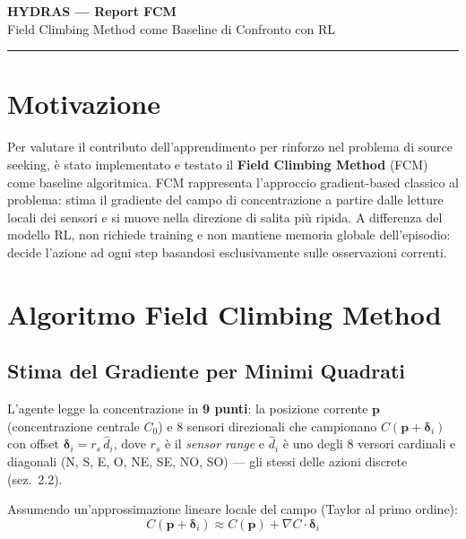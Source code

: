\documentclass[12pt, a4paper]{article}
\begin{document}
\begin{center}
    {\LARGE\bfseries HYDRAS --- Report FCM}\\[6pt]
    {\large Field Climbing Method come Baseline di Confronto con RL}
\end{center}
\vspace{0.3cm}
\hrule
\vspace{0.5cm}

\section{Motivazione}

Per valutare il contributo dell'apprendimento per rinforzo nel problema di source
seeking, \`e stato implementato e testato il \textbf{Field Climbing Method} (FCM)
come baseline algoritmica.
FCM rappresenta l'approccio gradient-based classico al problema: stima il gradiente
del campo di concentrazione a partire dalle letture locali dei sensori e si muove
nella direzione di salita pi\`u ripida.
A differenza del modello RL, non richiede training e non mantiene memoria globale
dell'episodio: decide l'azione ad ogni step basandosi esclusivamente sulle
osservazioni correnti.

\section{Algoritmo Field Climbing Method}

\subsection{Stima del Gradiente per Minimi Quadrati}

L'agente legge la concentrazione in \textbf{9 punti}: la posizione corrente
$\mathbf{p}$ (concentrazione centrale $C_0$) e 8 sensori direzionali che
campionano $C(\mathbf{p} + \boldsymbol{\delta}_i)$ con offset
$\boldsymbol{\delta}_i = r_s\,\hat{d}_i$, dove $r_s$ \`e il \emph{sensor range}
e $\hat{d}_i$ \`e uno degli 8 versori cardinali e diagonali
(N, S, E, O, NE, SE, NO, SO) --- gli stessi delle azioni discrete (sez.~2.2).

Assumendo un'approssimazione lineare locale del campo (Taylor al primo ordine):
\begin{equation}
    C(\mathbf{p} + \boldsymbol{\delta}_i) \approx C(\mathbf{p}) + \nabla C \cdot \boldsymbol{\delta}_i
\end{equation}
\end{document}
